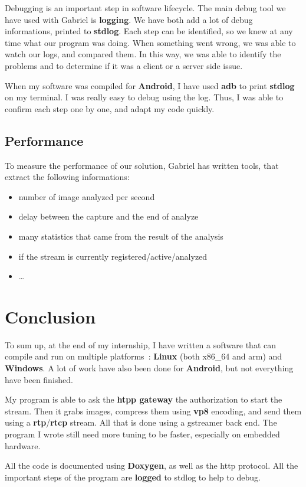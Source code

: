 \documentclass[a4paper,11pt]{custom}
\newcommand{\rtp}{\textbf{rtp}\xspace}
\newcommand{\rtcp}{\textbf{rtcp}\xspace}
\newcommand{\vpx}{\textbf{vp8}\xspace}
\newcommand{\linux}{\textbf{Linux}\xspace}
\newcommand{\win}{\textbf{Windows}\xspace}
\newcommand{\android}{\textbf{Android}\xspace}
\begin{document}
Debugging is an important step in software lifecycle. The main debug tool we have
used with Gabriel is \textbf{logging}. We have both add a lot of debug
informations, printed to \textbf{stdlog}. Each step can be identified, so we knew
at any time what our program was doing. When something went wrong, we was able
to watch our logs, and compared them. In this way, we was able to identify
the problems and to determine if it was a client or a server side issue.

When my software was compiled for \android, I have used \textbf{adb} to print
\textbf{stdlog} on my terminal. I was really easy to debug using the log. Thus,
I was able to confirm each step one by one, and adapt my code quickly.

\subsection{Performance}

To measure the performance of our solution, Gabriel has written tools, that
extract the following informations:
\begin{itemize}
\item number of image analyzed per second
\item delay between the capture and the end of analyze
\item many statistics that came from the result of the analysis
\item if the stream is currently registered/active/analyzed
\item …
\end{itemize}

\section{Conclusion}

To sum up, at the end of my internship, I have written a software that can compile
and run on multiple platforms~: \linux{} (both x86\_64 and arm) and \win. A lot
of work have also been done for \android, but not everything have been finished.

My program is able to ask the \textbf{htpp gateway} the authorization to start the stream.
Then it grabs images, compress them using \vpx{} encoding, and send them using a
\rtp{}/\rtcp{} stream. All that is done using a gstreamer back end. The program I
wrote still need more tuning to be faster, especially on embedded hardware.

All the code is documented using \textbf{Doxygen}, as well as the http protocol.
All the important steps of the program are \textbf{logged} to stdlog to help
to debug.
\end{document}
